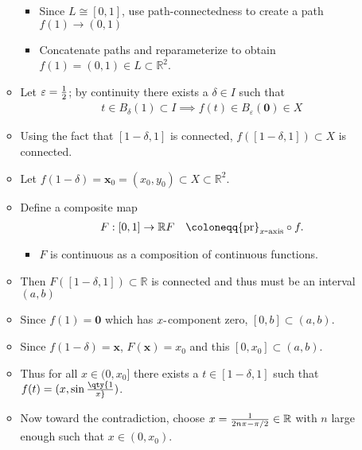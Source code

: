\begin{solution}
\begin{itemize}
\begin{itemize}
    \begin{itemize}
    \tightlist
    \item
      Since \(L \cong [0, 1]\), use path-connectedness to create a path
      \(f(1) \to (0, 1)\)
    \item
      Concatenate paths and reparameterize to obtain
      \(f(1) = (0, 1) \in L \subset {\mathbb{R}}^2\).
    \end{itemize}
  \item
    Let \(\varepsilon= {1\over 2}\); by continuity there exists a
    \(\delta\in I\) such that
    \begin{align*}
    t\in B_\delta(1) \subset I \implies f(t) \in B_\varepsilon(\mathbf{0}) \in X
    \end{align*}
  \item
    Using the fact that \([1-\delta, 1]\) is connected,
    \(f([1-\delta, 1]) \subset X\) is connected.
  \item
    Let
    \(f(1-\delta) = \mathbf{x}_0 = (x_0, y_0) \subset X\subset {\mathbb{R}}^2\).
  \item
    Define a composite map
    \begin{align*}     F: [0, 1] &\to {\mathbb{R}}     F &\coloneqq{\operatorname{pr}}_{x{\hbox{-}}\text{axis}} \circ f     .\end{align*}

    \begin{itemize}
    \tightlist
    \item
      \(F\) is continuous as a composition of continuous functions.
    \end{itemize}
  \item
    Then \(F([1-\delta, 1]) \subset {\mathbb{R}}\) is connected and thus
    must be an interval \((a, b)\)
  \item
    Since \(f(1) = \mathbf{0}\) which has \(x{\hbox{-}}\)component zero,
    \([0, b] \subset (a, b)\).
  \item
    Since \(f(1-\delta) = \mathbf{x}\), \(F(\mathbf{x}) = x_0\) and this
    \([0, x_0] \subset (a, b)\).
  \item
    Thus for all \(x \in (0, x_0]\) there exists a
    \(t\in [1-\delta, 1]\) such that \(f(t) = (x, \sin\qty{1\over x})\).
  \item
    Now toward the contradiction, choose
    \(x = {1 \over 2n\pi - \pi/2} \in {\mathbb{R}}\) with \(n\) large
    enough such that \(x\in (0, x_0)\).


\end{itemize}
\end{itemize}
\end{solution}

